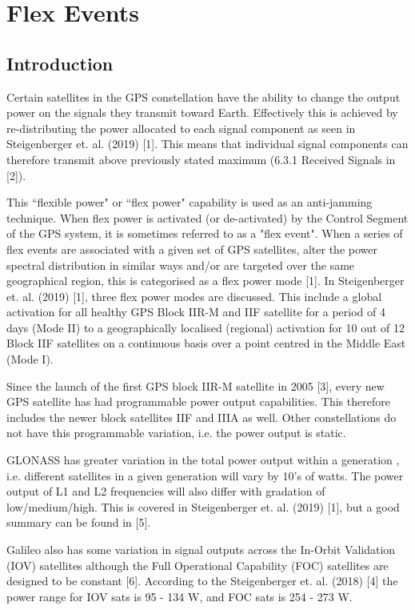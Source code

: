 \chapter{Flex Events}
\label{ch:flex_events}

\section{Introduction}

Certain satellites in the GPS constellation have the ability to change the output power on the signals they transmit toward Earth. Effectively this is achieved by re-distributing the power allocated to each signal component as seen in Steigenberger et. al. (2019) [1]. This means that individual signal components can therefore transmit above previously stated maximum (6.3.1 Received Signals in [2]). 
\\
\par
This ``flexible power" or ``flex power" capability is used as an anti-jamming technique. When flex power is activated (or de-activated) by the Control Segment of the GPS system, it is sometimes referred to as a "flex event". When a series of flex events are associated with a given set of GPS satellites, alter the power spectral distribution in similar ways and/or are targeted over the same geographical region, this is categorised as a flex power mode [1]. In Steigenberger et. al. (2019) [1], three flex power modes are discussed. This include a global activation for all healthy GPS Block IIR-M and IIF satellite for a period of 4 days (Mode II) to a geographically localised (regional) activation for 10 out of 12 Block IIF satellites on a continuous basis over a point centred in the Middle East (Mode I).
\\
\par
Since the launch of the first GPS block IIR-M satellite in 2005 [3], every new GPS satellite has had programmable power output capabilities. This therefore includes the newer block satellites IIF and IIIA as well. Other constellations do not have this programmable variation, i.e. the power output is static.
\\
\par
GLONASS has greater variation in the total power output within a generation , i.e. different satellites in a given generation will vary by 10’s of watts. The power output of L1 and L2 frequencies will also differ with gradation of low/medium/high. This is covered in Steigenberger et. al. (2019) [1], but a good summary can be found in [5].
\\
\par
Galileo also has some variation in signal outputs across the In-Orbit Validation (IOV) satellites although the Full Operational Capability (FOC) satellites are designed to be constant [6]. According to the  Steigenberger et. al. (2018) [4] the power range for IOV sats is 95 - 134 W, and FOC sats is 254 - 273 W.
\\
\par
